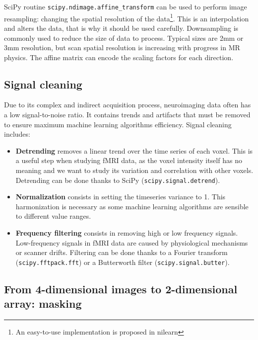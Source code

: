 \documentclass{frontiersSCNS} %
\begin{document}
SciPy routine \texttt{scipy.ndimage.affine\_transform}
can be used to perform image resampling: 
changing the spatial resolution of the data\footnote{An easy-to-use
implementation is proposed in nilearn}. This is
an interpolation and alters the data, that is why it should be used carefully.
Downsampling is commonly used to reduce the size of data to process.
Typical sizes are 2mm or 3mm resolution, but scan spatial resolution is
increasing with progress in MR physics. The affine matrix can encode the
scaling factors for each direction.

\subsection{Signal cleaning}

Due to its complex and indirect acquisition process, neuroimaging data often has a low
signal-to-noise ratio. It contains trends and artifacts that must be removed
to ensure maximum machine learning algorithms efficiency. Signal cleaning
includes:
\begin{itemize}
    \item{\bf Detrending} removes a linear trend over the time series of each
        voxel. This is a useful step when studying fMRI data, as the voxel
        intensity itself has no meaning and we want to study its variation and
        correlation with other voxels. Detrending can be done thanks to SciPy
        (\texttt{scipy.signal.detrend}).
    \item{\bf Normalization} consists in setting the timeseries variance to 1.
        This harmonization is necessary as some machine learning algorithms are
        sensible to different value ranges.
    \item{\bf Frequency filtering} consists in removing high or low
        frequency signals. Low-frequency signals in fMRI data are caused by
        physiological mechanisms or scanner drifts. Filtering can be done thanks
        to a Fourier transform (\texttt{scipy.fftpack.fft}) or a Butterworth
        filter (\texttt{scipy.signal.butter}).
\end{itemize}

\subsection{From 4-dimensional images to 2-dimensional array: masking}

\label{sec:unmasking}
\end{document}
